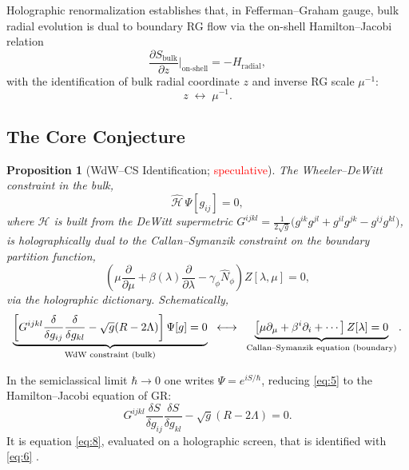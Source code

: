 \documentclass[11pt,a4paper]{article}
\newtheorem{proposition}{Proposition}
\begin{document}
Holographic renormalization \cite{skenderis2002} establishes that, in
Fefferman--Graham gauge, bulk radial evolution is dual to boundary RG flow
via the on-shell Hamilton--Jacobi relation
\begin{equation}\label{eq:3}
  \frac{\partial S_{\text{bulk}}}{\partial z}\bigg|_{\text{on-shell}}
  = -H_{\text{radial}},
\end{equation}
with the identification of bulk radial coordinate $z$ and inverse RG scale
$\mu^{-1}$:
\begin{equation}\label{eq:4}
  z \;\longleftrightarrow\; \mu^{-1}.
\end{equation}

\subsection{The Core Conjecture}

\begin{proposition}[WdW--CS Identification; \textcolor{red}{speculative}]
The Wheeler--DeWitt constraint in the bulk,
\begin{equation}\label{eq:5}
  \hat{\mathcal{H}}\,\Psi[g_{ij}] = 0,
\end{equation}
where $\hat{\mathcal{H}}$ is built from the DeWitt supermetric
$G^{ijkl} = \tfrac{1}{2\sqrt{g}}\bigl(g^{ik}g^{jl}+g^{il}g^{jk}-g^{ij}g^{kl}\bigr)$,
is holographically dual to the Callan--Symanzik constraint on the boundary
partition function,
\begin{equation}\label{eq:6}
  \left(\mu\frac{\partial}{\partial\mu}
    + \beta(\lambda)\frac{\partial}{\partial\lambda}
    - \gamma_\phi\hat{N}_\phi\right)Z[\lambda,\mu] = 0,
\end{equation}
via the holographic dictionary.
Schematically,
\begin{equation}\label{eq:7}
  \underbrace{%
    \left[
      G^{ijkl}\frac{\delta}{\delta g_{ij}}\frac{\delta}{\delta g_{kl}}
      -\sqrt{g}(R-2\Lambda)
    \right]\Psi[g]=0
  }_{\text{WdW constraint (bulk)}}
  \;\;\longleftrightarrow\;\;
  \underbrace{%
    \left[
      \mu\partial_\mu + \beta^i\partial_i + \cdots
    \right]Z[\lambda]=0
  }_{\text{Callan--Symanzik equation (boundary)}}.
\end{equation}
\end{proposition}

\noindent
In the semiclassical limit $\hbar\to 0$ one writes $\Psi=e^{iS/\hbar}$,
reducing \eqref{eq:5} to the Hamilton--Jacobi equation of GR:
\begin{equation}\label{eq:8}
  G^{ijkl}
    \frac{\delta S}{\delta g_{ij}}\frac{\delta S}{\delta g_{kl}}
  -\sqrt{g}(R-2\Lambda)=0.
\end{equation}
It is equation \eqref{eq:8}, evaluated on a holographic screen, that is
identified with \eqref{eq:6} \cite{skenderis2002}.
\end{document}
